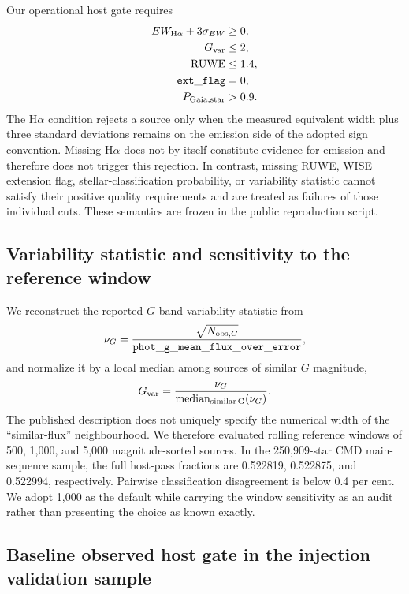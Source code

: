\documentclass[fleqn,usenatbib]{mnras}
\begin{document}
Our operational host gate requires
\begin{align}
EW_{{\rm H}\alpha}+3\sigma_{EW}&\ge0,\\
G_{\rm var}&\le2,\\
{\rm RUWE}&\le1.4,\\
{\tt ext\_flag}&=0,\\
P_{\rm Gaia,star}&>0.9.
\end{align}
The H$\alpha$ condition rejects a source only when the measured equivalent width plus three standard deviations remains on the emission side of the adopted sign convention. Missing H$\alpha$ does not by itself constitute evidence for emission and therefore does not trigger this rejection. In contrast, missing RUWE, WISE extension flag, stellar-classification probability, or variability statistic cannot satisfy their positive quality requirements and are treated as failures of those individual cuts. These semantics are frozen in the public reproduction script.

\subsection{Variability statistic and sensitivity to the reference window}

We reconstruct the reported $G$-band variability statistic from
\begin{equation}
\nu_G=\frac{\sqrt{N_{{\rm obs},G}}}
{{\tt phot\_g\_mean\_flux\_over\_error}},
\end{equation}
and normalize it by a local median among sources of similar $G$ magnitude,
\begin{equation}
G_{\rm var}=\frac{\nu_G}
{\operatorname{median}_{\rm similar\,G}(\nu_G)}.
\end{equation}
The published description does not uniquely specify the numerical width of the ``similar-flux'' neighbourhood. We therefore evaluated rolling reference windows of 500, 1,000, and 5,000 magnitude-sorted sources. In the 250,909-star CMD main-sequence sample, the full host-pass fractions are 0.522819, 0.522875, and 0.522994, respectively. Pairwise classification disagreement is below 0.4 per cent. We adopt 1,000 as the default while carrying the window sensitivity as an audit rather than presenting the choice as known exactly.

\subsection{Baseline observed host gate in the injection validation sample}
\end{document}
